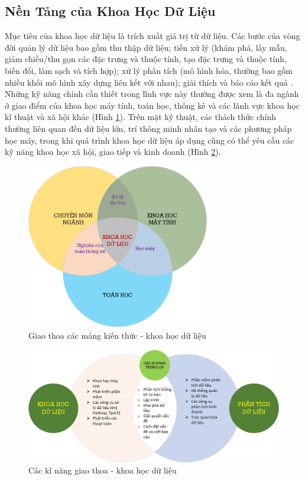 \documentclass[utf8]{frontiersSCNS} %
\begin{document}
\subsection{Nền Tảng của Khoa Học Dữ Liệu}
Mục tiêu của khoa học dữ liệu là trích xuất giá trị từ dữ liệu. Các bước của vòng đời quản lý dữ liệu bao gồm thu thập dữ liệu; tiền xử lý (khám phá, lấy mẫu, giảm chiều/thu gọn các đặc trưng và thuộc tính, tạo đặc trưng và thuộc tính, biến đổi, làm sạch và tích hợp); xử lý phân tích (mô hình hóa, thường bao gồm nhiều khối mô hình xây dựng liên kết với nhau); giải thích và báo cáo kết quả \citep{Aggarwal2015}. Những kỹ năng chính cần thiết trong lĩnh vực này thường được xem là đa ngành ở giao điểm của khoa học máy tính, toán học, thống kê và các lãnh vực khoa học kĩ thuật và xã hội khác (Hình \ref{fig:khoahocdulieu01}). Trên mặt kỹ thuật, các thách thức chính thường liên quan đến dữ liệu lớn, trí thông minh nhân tạo và các phương pháp học máy, trong khi quá trình khoa học dữ liệu áp dụng cũng có thể yêu cầu các kỹ năng khoa học xã hội, giao tiếp và kinh doanh (Hình \ref{fig:khoahocdulieu02}).

\FloatBarrier
\begin{figure}[h]
	\centering
	\begin{center}
		\includegraphics[width=8cm]{khoahocdulieu01}%
	\end{center}
	\caption{Giao thoa các mảng kiến thức - khoa học dữ liệu}\label{fig:khoahocdulieu01}
\end{figure}
\FloatBarrier

\FloatBarrier
\begin{figure}[h]
	\centering
	\begin{center}
		\includegraphics[width=\textwidth]{khoahocdulieu02}%
	\end{center}
	\caption{Các kĩ năng giao thoa - khoa học dữ liệu}\label{fig:khoahocdulieu02}
\end{figure}
\FloatBarrier
\end{document}
